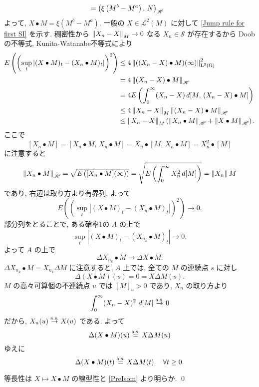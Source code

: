 \documentclass{ltjsarticle}
\begin{document}
\begin{prf}
\begin{equation}
\begin{aligned}
			                     & =	\left( \xi \left( M^b - M^a \right),\,N \right)_{\mathscr{H}}
		\end{aligned}
	\end{equation}
	よって, \( X \bullet M = \xi (M^b - M^a). \)
	一般の \( X \in \mathscr{L}^2(M) \) に対して \eqref{Jump rule for first SI} を示す.
	稠密性から
	\( 
	\left\| X_n - X \right\|_{ M } \to 0 \) なる \( X_n \in \mathscr{S} \) が存在するから
	Doobの不等式, Kunita-Watanabe不等式により
	\begin{equation}
		\begin{aligned}
			E \left( \left( \sup_t \left| ( X \bullet M )_t - ( X_n \bullet M )_t \right| \right)^2 \right)
			 & \le 4 \left\|  ( (X_n - X) \bullet M ) (\infty)  \right\|_{\mathrm{L}^2(\Omega)}^2                                      \\
			 & =4 \left\| (X_n - X) \bullet M \right\|_{\mathscr{H}}                                                           \\
			 & =4 E \left( \int_0^{\infty} (X_n - X) \, d[M,\, ( X_n - X ) \bullet M] \right)           \\
			 & \le 4 \left\| X_n - X \right\|_{ M } \left\|  ( X_n - X) \bullet M  \right\|_{\mathscr{H}}                                \\
			 & \le \left\| X_n - X \right\|_{ M } \left(\left\|  X_n \bullet M  \right\|_{\mathscr{H}} + \left\|  X \bullet M  \right\|_{\mathscr{H}} \right).
		\end{aligned}
	\end{equation}
	ここで
	\[
		[ X_n \bullet M ] = [ X_n \bullet M,\, X_n \bullet M ]
		= X_n \bullet [ M,\, X_n \bullet M ]
		= X_n^2 \bullet [ M ]
	\]
	に注意すると
	\begin{equation}		\label{PreIsom}
		\left\|  X_n \bullet M  \right\|_{\mathscr{H}}	=	\sqrt{ E\left( [ X_n \bullet M ] (\infty) \right) }
		=	\sqrt{ E \left( \int_0^{\infty} X_n^2\, d[M] \right) }
		=	
		\left\| X_n \right\|{ M }
	\end{equation}
	であり, 右辺は取り方より有界列.
	よって
	\[
		E\left( \left(
		\sup_t \left| ( X \bullet M )_t - ( X_n \bullet M )_t \right| 
		\right)^2 \right) \to 0.
	\]
	部分列をとることで, ある確率1の \( A \) の上で
	\[
		\sup_t | ( X \bullet M )_t - ( X_{n_k} \bullet M )_t | \to 0.
	\]
	よって \( A \) の上で
	\[
		\Delta X_{n_k} \bullet M \to \Delta X \bullet M.
	\]
	\( \Delta X_{n_k} \bullet M = X_{n_k} \Delta M \)
	に注意すると, \( A \) 上では, 全ての \( M \) の連続点 \( s \) に対し 
	\[
		\Delta ( X \bullet M )(s) = 0 = X \Delta M (s).
	\]
	\( M \) の高々可算個の不連続点 \( u \) では \( [M]_u > 0 \) であり,
	\( X_n \) の取り方より
	\[
		\int_0^{\infty} ( X_n - X )^2 \ d[M] \stackrel{ \mathrm{ a.s.} }{ \to } 0
	\]
	だから, \( X_n(u) \stackrel{ \mathrm{ a.s.} }{ \to } X(u) \) である. よって
	\[
		\Delta ( X \bullet M )(u) \stackrel{ \text{a.s.} }{ = } X \Delta M (u)
	\]
	ゆえに
	\[
		\Delta ( X \bullet M) (t) \stackrel{ \text{a.s.} }{ = } X \Delta M(t). \quad \forall t \ge 0.
	\]
	
	等長性は \( X \mapsto X \bullet M \) の線型性と \eqref{PreIsom} より明らか.
	\qed\end{prf}
\end{document}
